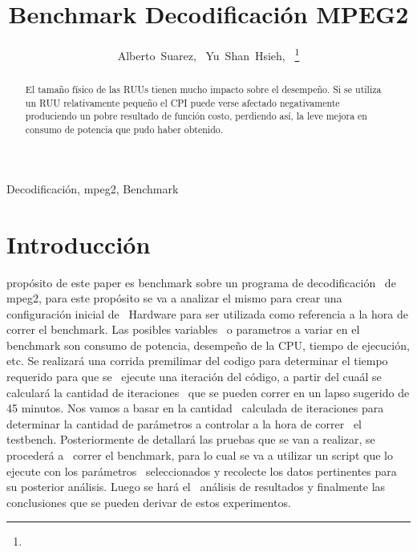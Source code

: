 \documentclass[journal]{IEEEtran}
\begin{document}
%
\title{Benchmark Decodificaci\'{o}n MPEG2}
\author{Alberto~Suarez,~
        Yu~Shan~Hsieh,~%
\thanks{}%
}
\maketitle

\begin{abstract}
El tama\~no f\'isico de las RUUs tienen mucho impacto sobre el desempe\~no. Si se utiliza un RUU relativamente peque\~no el CPI puede verse afectado negativamente produciendo un pobre resultado de funci\'on costo, perdiendo as\'i, la leve
mejora en consumo de potencia que pudo haber obtenido.
\end{abstract}

\begin{IEEEkeywords}
Decodificaci\'{o}n, mpeg2, Benchmark
\end{IEEEkeywords}

\section{Introducci\'{o}n}
 prop\'{o}sito de este paper es benchmark sobre un programa de decodificaci\'{o}n \
de mpeg2, para este prop\'osito se va a analizar el mismo para crear una configuraci\'on inicial de \
Hardware para ser utilizada como referencia a la hora de correr el benchmark. Las posibles variables \
o parametros a variar en el benchmark son consumo de potencia, desempe\~{n}o de la CPU, tiempo de ejecuci\'{o}n, etc. 
Se realizar\'a una corrida premilimar del codigo para determinar el tiempo requerido para que se \
ejecute una iteraci\'on del c\'odigo, a partir del cua\'al se calcular\'a la cantidad de iteraciones \
que se pueden correr en un lapso sugerido de 45 minutos. \newline  Nos vamos a basar en la cantidad \
calculada de iteraciones para determinar la cantidad de par\'ametros a controlar a la hora de correr \
el testbench. Posteriormente de detallar\'{a} las pruebas que se van a realizar, se proceder\'a a \
correr el benchmark, para lo cual se va a utilizar un script que lo ejecute con los par\'ametros \
seleccionados y recolecte los datos pertinentes para su posterior an\'alisis. Luego se har\'{a} el \
an\'{a}lisis de resultados y finalmente las conclusiones que se pueden derivar de estos experimentos.
\end{document}
